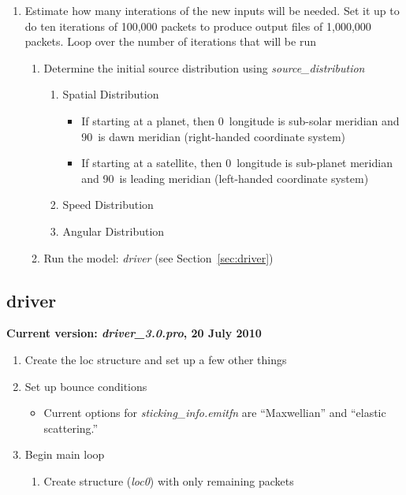 \documentclass[11pt]{article}
\begin{document}
\begin{enumerate}
\item Estimate how many interations of the new inputs will be needed. Set it up to do ten
iterations of 100,000 packets to produce output files of 1,000,000 packets. 
Loop over the number of iterations that will be run
  \begin{enumerate}
  \item Determine the initial source distribution using \textit{source\_distribution}
    \begin{enumerate}
    \item Spatial Distribution
      \begin{itemize}
      \item If starting at a planet, then 0\degr\ longitude is sub-solar meridian 
      and 90\degr\ is dawn meridian (right-handed coordinate system)
      \item If starting at a satellite, then 0\degr\ longitude is sub-planet meridian and
      90\degr\ is leading meridian (left-handed coordinate system)
      \end{itemize}
    \item Speed Distribution
    \item Angular Distribution
    \end{enumerate}
  \item Run the model: \textit{driver} (see Section~\ref{sec:driver})
  \end{enumerate}

\end{enumerate}

\subsection{driver \label{sec:driver}}

\textbf{Current version: \textit{driver\_3.0.pro}, 20 July 2010}

\begin{enumerate}
\item Create the loc structure and set up a few other things
\item Set up bounce conditions
  \begin{itemize}
  \item Current options for \textit{sticking\_info.emitfn} are ``Maxwellian''
  and ``elastic scattering.'' 
  \end{itemize}
\item Begin main loop
  \begin{enumerate}
  \item Create structure (\textit{loc0}) with only remaining packets
  \end{enumerate}
\end{enumerate}
\end{document}
